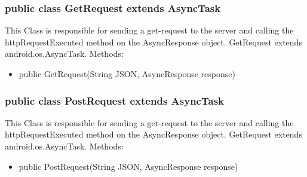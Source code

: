 	\subsubsection{public class GetRequest extends AsyncTask}
This Class is responsible for sending a get-request to the server and calling the httpRequestExecuted method on the AsyncResponse object. GetRequest extends android.os.AsyncTask.
	\newline Methods:
	\begin{itemize}
	\item public GetRequest(String JSON, AsyncResponse response)
	\end{itemize}
	
	\subsubsection{public class PostRequest extends AsyncTask}
This Class is responsible for sending a get-request to the server and calling the httpRequestExecuted method on the AsyncResponse object. GetRequest extends android.os.AsyncTask.
	\newline Methods:
	\begin{itemize}
	\item public PostRequest(String JSON, AsyncResponse response)
	\end{itemize}
	
	
